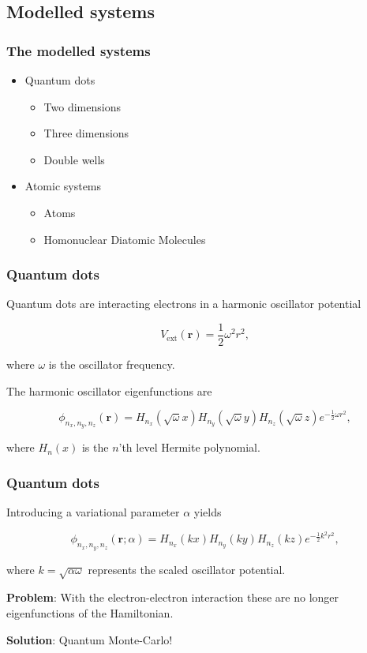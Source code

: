 \subsection{Modelled systems}

\begin{frame}
 \frametitle{The modelled systems}
 \begin{itemize}
  \item Quantum dots
  \begin{itemize}
  \item Two dimensions
  \item Three dimensions
  \item Double wells
  \end{itemize}
  \pause
  \item Atomic systems
  \begin{itemize}
  \item Atoms
  \item Homonuclear Diatomic Molecules
  \end{itemize}
 \end{itemize}
\end{frame}

\begin{frame}
 \frametitle{Quantum dots}
 
 Quantum dots are interacting electrons in a harmonic oscillator potential
 
 \begin{equation}
  V_\mathrm{ext}(\mathbf{r}) = \frac{1}{2}\omega^2r^2,
 \end{equation}
 
 where $\omega$ is the oscillator frequency.
 
 \pause
 
 The harmonic oscillator eigenfunctions are
 
 \begin{equation}
  \phi_{n_x, n_y, n_z}(\mathbf{r}) = H_{n_x}(\sqrt{\omega}x)H_{n_y}(\sqrt{\omega}y)H_{n_z}(\sqrt{\omega}z)e^{-\frac{1}{2}\omega r^2},
 \end{equation}
 
 where $H_n(x)$ is the $n$'th level Hermite polynomial.


 
\end{frame}

\begin{frame}
 \frametitle{Quantum dots}
 
 Introducing a variational parameter $\alpha$ yields
 
 \begin{equation}
  \phi_{n_x, n_y, n_z}(\mathbf{r}; \alpha) = H_{n_x}(kx)H_{n_y}(ky)H_{n_z}(kz)e^{-\frac{1}{2}k^2r^2},
 \end{equation}
 
 where $k = \sqrt{\alpha\omega}$ represents the scaled oscillator potential.
 \shift

 \textbf{Problem}: With the electron-electron interaction these are no longer eigenfunctions of the Hamiltonian.
 \shift
 
 \textbf{Solution}: Quantum Monte-Carlo!
 
\end{frame}

